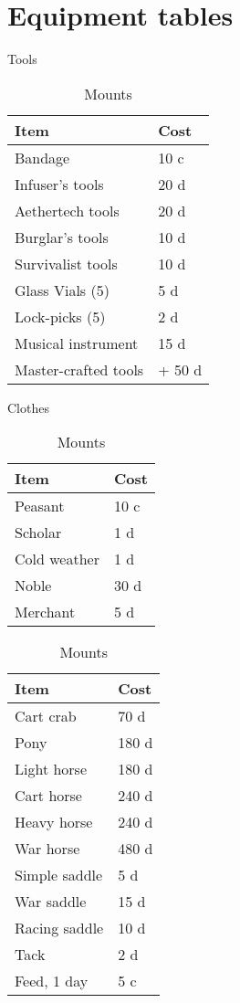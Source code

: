 \documentclass[a4paper,11pt,oneside]{book}
\begin{document}
\chapter{Equipment tables}
\begin{table}[ht]
	\parbox{0.45\hsize}{
	\centering
	\caption{Tools}
	\label{tab:tools}
	\begin{tabular}{|l|l|}
		\hline
		Item & Cost\\ [0.5ex]
		\hline
		Bandage & 10 c\\
		Infuser's tools & 20 d\\
		Aethertech tools & 20 d \\
		Burglar's tools & 10 d \\
		Survivalist tools & 10 d \\
		Glass Vials (5)& 5 d\\
		Lock-picks (5) & 2 d\\
		Musical instrument & 15 d\\		
		\hline
		Master-crafted tools & + 50 d\\
		\hline
	\end{tabular}}
	\parbox{0.45\hsize}{
	\centering
	\caption{Clothes}
	\begin{tabular}{|l|l|}
		\hline
		Item & Cost\\ [0.5ex]
		\hline
		Peasant & 10 c\\
		Scholar & 1 d\\
		Cold weather & 1 d\\
		Noble & 30 d\\
		Merchant & 5 d\\
		\hline
	\end{tabular}}

	\centering
	\caption{Mounts}
	\begin{tabular}{|l|l|}
		\hline
		Item & Cost\\ [0.5ex]
		\hline
		Cart crab & 70 d \\ 
		Pony & 180 d\\
		Light horse & 180 d\\
		Cart horse & 240 d\\
		Heavy horse & 240 d\\
		War horse & 480 d\\
		\hline
		Simple saddle & 5 d\\
		War saddle & 15 d\\
		Racing saddle & 10 d\\
		Tack & 2 d\\
		Feed, 1 day & 5 c\\
		\hline
	\end{tabular}
\end{table}
\end{document}
